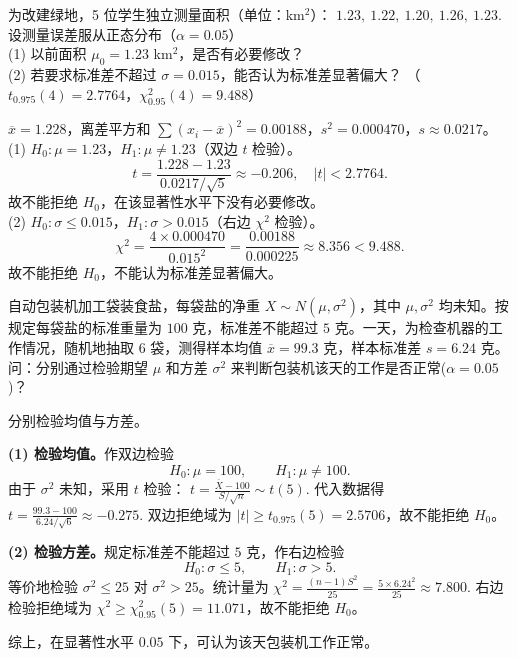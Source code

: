 \documentclass[lang=cn,11pt]{elegantbook}
\begin{document}
\begin{exercise} \label{ex:ht_combo}
为改建绿地，5 位学生独立测量面积（单位：km\(^2\)）：
\(
1.23,\ 1.22,\ 1.20,\ 1.26,\ 1.23.
\)
设测量误差服从正态分布（\(\alpha=0.05\)）\\
(1) 以前面积 \(\mu_0=1.23\) km\(^2\)，是否有必要修改？\\
(2) 若要求标准差不超过 \(\sigma=0.015\)，能否认为标准差显著偏大？
（\(t_{0.975}(4)=2.7764\)，\(\chi^2_{0.95}(4)=9.488\)）
\end{exercise}
\begin{solution}
\(\overline{x}=1.228\)，离差平方和 \(\sum(x_i-\overline{x})^2=0.00188\)，\(s^2=0.000470\)，\(s\approx0.0217\)。\\
(1) \(H_0\colon\mu=1.23\)，\(H_1\colon\mu\neq1.23\)（双边 \(t\) 检验）。
\[
t=\frac{1.228-1.23}{0.0217/\sqrt{5}}\approx-0.206,\quad |t|<2.7764.
\]
故不能拒绝 \(H_0\)，在该显著性水平下没有必要修改。\\
(2) \(H_0\colon\sigma\leq0.015\)，\(H_1\colon\sigma>0.015\)（右边 \(\chi^2\) 检验）。
\[
\chi^2=\frac{4\times0.000470}{0.015^2}=\frac{0.00188}{0.000225}\approx8.356<9.488.
\]
故不能拒绝 \(H_0\)，不能认为标准差显著偏大。
\end{solution}

\begin{exercise}\label{exer:src-2009-3b-08}
自动包装机加工袋装食盐，每袋盐的净重 \(X\sim N(\mu,\sigma^2)\)，其中 \(\mu,\sigma^2\) 均未知。按规定每袋盐的标准重量为 \(100\) 克，标准差不能超过 \(5\) 克。一天，为检查机器的工作情况，随机地抽取 \(6\) 袋，测得样本均值 \(\overline x=99.3\) 克，样本标准差 \(s=6.24\) 克。问：分别通过检验期望 \(\mu\) 和方差 \(\sigma^2\) 来判断包装机该天的工作是否正常(\(\alpha=0.05\))？
\end{exercise}
\begin{solution}
分别检验均值与方差。

\textbf{(1) 检验均值。}作双边检验
\[
H_0\colon \mu=100,\qquad H_1\colon \mu\neq100.
\]
由于 \(\sigma^2\) 未知，采用 \(t\) 检验：
\(
t=\frac{\overline X-100}{S/\sqrt n}\sim t(5).
\)
代入数据得
\(
t=\frac{99.3-100}{6.24/\sqrt6}\approx -0.275.
\)
双边拒绝域为 \(|t|\ge t_{0.975}(5)=2.5706\)，故不能拒绝 \(H_0\)。

\textbf{(2) 检验方差。}规定标准差不能超过 \(5\) 克，作右边检验
\[
H_0\colon \sigma\le5,\qquad H_1\colon \sigma>5.
\]
等价地检验 \(\sigma^2\le25\) 对 \(\sigma^2>25\)。统计量为
\(
\chi^2=\frac{(n-1)S^2}{25}=\frac{5\times6.24^2}{25}\approx7.800.
\)
右边检验拒绝域为 \(\chi^2\ge\chi^2_{0.95}(5)=11.071\)，故不能拒绝 \(H_0\)。

综上，在显著性水平 \(0.05\) 下，可认为该天包装机工作正常。
\end{solution}
\end{document}
